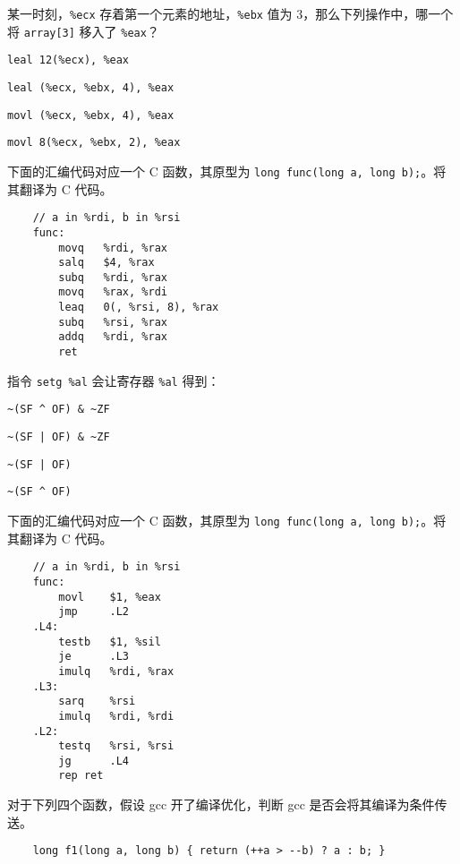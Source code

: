 \begin{problems}
        某一时刻，\verb|%ecx| 存着第一个元素的地址，\verb|%ebx| 值为 3，那么下列操作中，哪一个将 \verb|array[3]| 移入了 \verb|%eax|？
        \begin{choices}
            \item \verb|leal 12(%ecx), %eax|
            \item \verb|leal (%ecx, %ebx, 4), %eax|
            \item \verb|movl (%ecx, %ebx, 4), %eax|
            \item \verb|movl 8(%ecx, %ebx, 2), %eax|
        \end{choices}
        \pro 下面的汇编代码对应一个 C 函数，其原型为 \verb|long func(long a, long b);|。将其翻译为 C 代码。
        \begin{verbatim}
    // a in %rdi, b in %rsi
    func:
        movq   %rdi, %rax
        salq   $4, %rax
        subq   %rdi, %rax
        movq   %rax, %rdi
        leaq   0(, %rsi, 8), %rax
        subq   %rsi, %rax
        addq   %rdi, %rax
        ret
        \end{verbatim}
        \pro 指令 \verb|setg %al| 会让寄存器 \verb|%al| 得到：
        \begin{choices}
            \item \verb+~(SF ^ OF) & ~ZF+
            \item \verb+~(SF | OF) & ~ZF+
            \item \verb+~(SF | OF)+
            \item \verb+~(SF ^ OF)+
        \end{choices}
        \pro 下面的汇编代码对应一个 C 函数，其原型为 \verb|long func(long a, long b);|。将其翻译为 C 代码。
        \begin{verbatim}
    // a in %rdi, b in %rsi
    func: 
        movl    $1, %eax
        jmp     .L2
    .L4: 
        testb   $1, %sil
        je      .L3
        imulq   %rdi, %rax
    .L3: 
        sarq    %rsi
        imulq   %rdi, %rdi
    .L2: 
        testq   %rsi, %rsi
        jg      .L4
        rep ret 
        \end{verbatim}
        \pro 对于下列四个函数，假设 gcc 开了编译优化，判断 gcc 是否会将其编译为条件传送。
        \qn
        \begin{verbatim}
    long f1(long a, long b) { return (++a > --b) ? a : b; }
        \end{verbatim}
        \qn
        \begin{verbatim}

\end{verbatim}
\end{problems}
